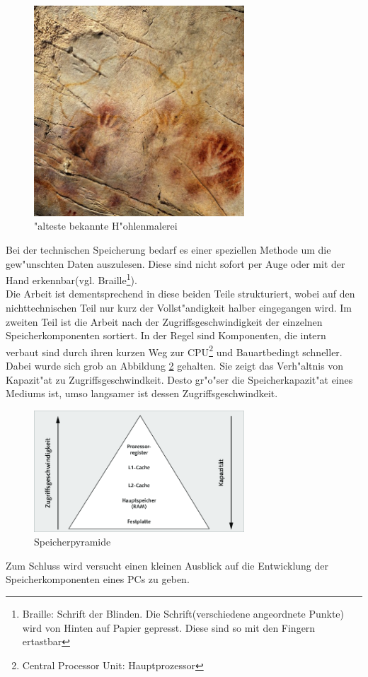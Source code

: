 \begin{figure}[ht]
\centering
\includegraphics[width=0.7\textwidth]{images/hohlenmalerei.jpeg} 
\caption["alteste bekannte H"ohlenmalerei \cite{fig:hohle}]{"alteste bekannte H"ohlenmalerei}
\label{fig:hohlenmalerei}
\end{figure}

Bei der technischen Speicherung bedarf es einer speziellen Methode um die gew"unschten Daten auszulesen. Diese sind nicht sofort per Auge oder mit der Hand erkennbar(vgl. Braille\footnote{Braille: Schrift der Blinden. Die Schrift(verschiedene angeordnete Punkte) wird von Hinten auf Papier gepresst. Diese sind so mit den Fingern ertastbar}). 
\\
Die Arbeit ist dementsprechend in diese beiden Teile strukturiert, wobei auf den nichttechnischen Teil nur kurz der Vollst"andigkeit halber eingegangen wird.
Im zweiten Teil ist die Arbeit nach der Zugriffsgeschwindigkeit der einzelnen Speicherkomponenten sortiert. In der Regel sind Komponenten, die intern verbaut sind durch ihren kurzen Weg zur CPU\footnote{Central Processor Unit: Hauptprozessor} und Bauartbedingt schneller.
\\
Dabei wurde sich grob an Abbildung \ref{fig:geschPyr} gehalten. Sie zeigt das Verh"altnis von Kapazit"at zu Zugriffsgeschwindkeit. Desto gr"o"ser die Speicherkapazit"at eines Mediums ist, umso langsamer ist dessen Zugriffsgeschwindkeit. 
\begin{figure}[ht]
\centering
\includegraphics[width=0.7\textwidth]{images/speicherpyramide} 
\caption[Speicherpyramide \cite{fig:Speicherpyramide}]{\glqq Speicherpyramide\grqq{}}
\label{fig:geschPyr}
\end{figure}

Zum Schluss wird versucht einen kleinen Ausblick auf die Entwicklung der Speicherkomponenten eines PCs zu geben.


